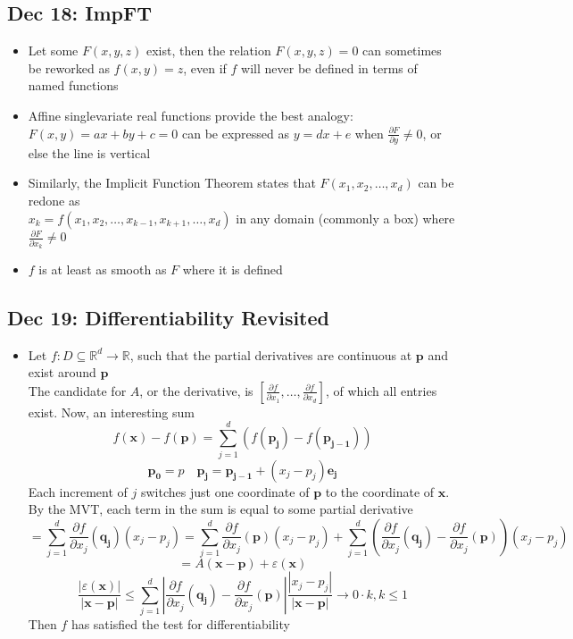 \documentclass[10pt, oneside]{article}
\newcommand{\del}{\partial}
\let\leq\leqslant
\let\ep\varepsilon
\newcommand{\R}{\mathbb{R}}
\renewcommand{\vec}[1]{\mathbf{#1}}
\begin{document}
\subsection{Dec 18: ImpFT}
\begin{itemize}
    \item Let some $F(x,y,z)$ exist, then the relation $F(x,y,z) = 0$ can sometimes be reworked as $f(x,y) = z$, even if $f$ will never be defined in terms of named functions
    \item Affine singlevariate real functions provide the best analogy: $F(x,y) = ax + by + c = 0$ can be expressed as $y = dx + e$ when $\frac{\del F}{\del y} \neq 0$, or else the line is vertical
    \item Similarly, the Implicit Function Theorem states that $F(x_1,x_2,\hdots,x_d)$ can be redone as \\ $x_k = f(x_1,x_2,\hdots,x_{k-1},x_{k+1},\hdots,x_d)$ in any domain (commonly a box) where $\frac{\del F}{\del x_k} \neq 0$
    \item $f$ is at least as smooth as $F$ where it is defined
\end{itemize}

\subsection{Dec 19: Differentiability Revisited}
\begin{itemize}
    \item Let $f: D \subseteq \R^d \rightarrow \R$, such that the partial derivatives are continuous at $\vec{p}$ and exist around $\vec{p}$\\
        The candidate for $A$, or the derivative, is $\left[ \frac{\del f}{\del x_1}, \hdots, \frac{\del f}{\del x_d} \right]$, of which all entries exist. Now, an interesting sum
        \[f(\vec{x}) - f(\vec{p}) = \sum_{j = 1}^d (f(\vec{p_j}) - f(\vec{p_{j-1}}))\]
        \[\vec{p_0} = p \quad \vec{p_j} = \vec{p_{j-1}} + (x_j - p_j)\vec{e_j}\]
        Each increment of $j$ switches just one coordinate of $\vec{p}$ to the coordinate of $\vec{x}$. By the MVT, each term in the sum is equal to some partial derivative
        \[= \sum_{j=1}^d \frac{\del f}{\del x_j} (\vec{q_j})(x_j - p_j) = \sum_{j=1}^d \frac{\del f}{\del x_j} (\vec{p})(x_j - p_j) + \sum_{j=1}^d \left(\frac{\del f}{\del x_j} (\vec{q_j}) - \frac{\del f}{\del x_j} (\vec{p})\right)(x_j - p_j)\]
        \[= A(\vec{x} - \vec{p}) + \ep(\vec{x})\]
        \[\frac{|\ep(\vec{x})|}{|\vec{x} - \vec{p}|} \leq \sum_{j=1}^d \left|\frac{\del f}{\del x_j} (\vec{q_j}) - \frac{\del f}{\del x_j} (\vec{p})\right|\frac{|x_j - p_j|}{|\vec{x} - \vec{p}|} \rightarrow 0 \cdot k, k \leq 1\]
        Then $f$ has satisfied the test for differentiability
\end{itemize}
\end{document}
